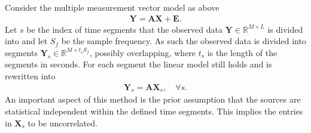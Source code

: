 Consider the multiple measurement vector model as above
\begin{align*}
\mathbf{Y} = \mathbf{AX}+\textbf{E}.
\end{align*}
Let $s$ be the index of time segments that the observed data $\mathbf{Y}\in \mathbb{R}^{M\times L}$ is divided into and let $S_f$ be the sample frequency. As such the observed data is divided into segments $\mathbf{Y}_s \in \mathbb{R}^{M \times t_s S_f}$, possibly overlapping, where $t_s$ is the length of the segments in seconds. For each segment the linear model still holds and is rewritten into
\begin{align*}
\mathbf{Y}_s = \mathbf{AX}_s, \quad \forall s.
\end{align*}
An important aspect of this method is the prior assumption that the sources are statistical independent within the defined time segments. This implies the entries in $\textbf{X}_s$ to be uncorrelated. 

